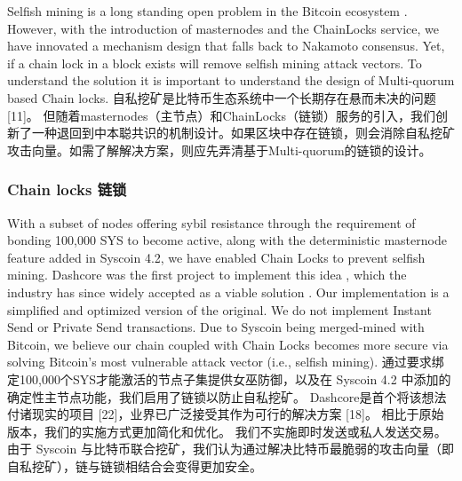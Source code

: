 \documentclass{ctexart}
\begin{document}
Selfish mining is a long standing open problem in the Bitcoin ecosystem \cite{Eya18}. However, with the introduction of masternodes and the ChainLocks service, we have innovated a mechanism design that falls back to Nakamoto consensus. Yet, if a chain lock in a block exists will remove selfish mining attack vectors. To understand the solution it is important to understand the design of Multi-quorum based Chain locks. 自私挖矿是比特币生态系统中一个长期存在悬而未决的问题 [11]。 但随着masternodes（主节点）和ChainLocks（链锁）服务的引入，我们创新了一种退回到中本聪共识的机制设计。如果区块中存在链锁，则会消除自私挖矿攻击向量。如需了解解决方案，则应先弄清基于Multi-quorum的链锁的设计。

\subsubsection{Chain locks 链锁}

With a subset of nodes offering sybil resistance through the requirement of bonding 100,000 SYS to become active, along with the deterministic masternode feature added in Syscoin 4.2, we have enabled Chain Locks to prevent selfish mining. Dashcore was the first project to implement this idea \cite{Blo18}, which the industry has since widely accepted as a viable solution \cite{Val19}. Our implementation is a simplified and optimized version of the original. We do not implement Instant Send or Private Send transactions. Due to Syscoin being merged-mined with Bitcoin, we believe our chain coupled with Chain Locks becomes more secure via solving Bitcoin’s most vulnerable attack vector (i.e., selfish mining). 通过要求绑定100,000个SYS才能激活的节点子集提供女巫防御，以及在 Syscoin 4.2 中添加的确定性主节点功能，我们启用了链锁以防止自私挖矿。 Dashcore是首个将该想法付诸现实的项目 [22]，业界已广泛接受其作为可行的解决方案 [18]。 相比于原始版本，我们的实施方式更加简化和优化。 我们不实施即时发送或私人发送交易。 由于 Syscoin 与比特币联合挖矿，我们认为通过解决比特币最脆弱的攻击向量（即自私挖矿），链与链锁相结合会变得更加安全。
\end{document}
